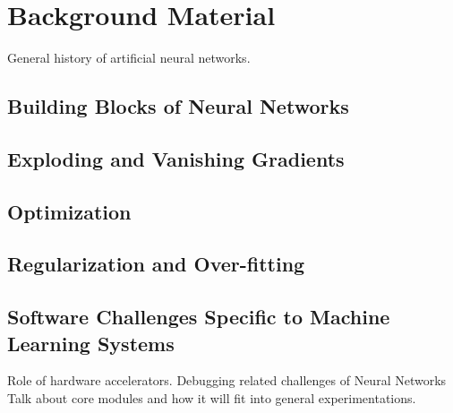 \chapter{Background Material}
General history of artificial neural networks.

\section{Building Blocks of Neural Networks}

\section{Exploding and Vanishing Gradients}

\section{Optimization}

\section{Regularization and Over-fitting}

\section{Software Challenges Specific to 
Machine Learning Systems} \label{sec:engchallenge}
Role of hardware accelerators. Debugging related challenges of Neural Networks
Talk about core modules and how it will fit into general experimentations. 
\clearpage